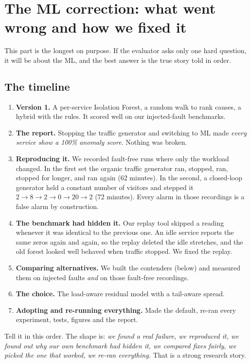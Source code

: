 \chapter{The ML correction: what went wrong and how we fixed it}
\label{ch:mlstory}

This part is the longest on purpose. If the evaluator asks only one hard question, it will be about the ML, and the best answer is the true story told in order.

\section{The timeline}
\begin{enumerate}
\item \textbf{Version 1.} A per-service Isolation Forest, a random walk to rank causes, a hybrid with the rules. It scored well on our injected-fault benchmarks.
\item \textbf{The report.} Stopping the traffic generator and switching to ML made \emph{every service show a 100\% anomaly score}. Nothing was broken.
\item \textbf{Reproducing it.} We recorded fault-free runs where only the workload changed. In the first set the organic traffic generator ran, stopped, ran, stopped for longer, and ran again (62 minutes). In the second, a closed-loop generator held a constant number of visitors and stepped it $2\to8\to2\to0\to20\to2$ (72 minutes). Every alarm in those recordings is a false alarm by construction.
\item \textbf{The benchmark had hidden it.} Our replay tool skipped a reading whenever it was identical to the previous one. An idle service reports the same zeros again and again, so the replay deleted the idle stretches, and the old forest looked well behaved when traffic stopped. We fixed the replay.
\item \textbf{Comparing alternatives.} We built the contenders (below) and measured them on injected faults \emph{and} on those fault-free recordings.
\item \textbf{The choice.} The load-aware residual model with a tail-aware spread.
\item \textbf{Adopting and re-running everything.} Made the default, re-ran every experiment, tests, figures and the report.
\end{enumerate}

\begin{saybox}
Tell it in this order. The shape is: \emph{we found a real failure, we reproduced it, we found out why our own benchmark had hidden it, we compared fixes fairly, we picked the one that worked, we re-ran everything.} That is a strong research story.
\end{saybox}

